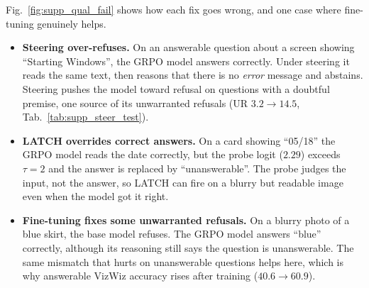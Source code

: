 Fig.~\ref{fig:supp_qual_fail} shows how each fix goes wrong, and one case where fine-tuning
genuinely helps.
\begin{itemize}\itemsep0pt
  \item \textbf{Steering over-refuses.} On an answerable question about a screen showing
        ``Starting Windows'', the GRPO model answers correctly. Under steering it reads the
        same text, then reasons that there is no \emph{error} message and abstains. Steering
        pushes the model toward refusal on questions with a doubtful premise, one source of
        its unwarranted refusals (UR $3.2\rightarrow14.5$, Tab.~\ref{tab:supp_steer_test}).
  \item \textbf{LATCH overrides correct answers.} On a card showing ``05/18'' the GRPO
        model reads the date correctly, but the probe logit ($2.29$) exceeds $\tau{=}2$ and
        the answer is replaced by ``unanswerable''. The probe judges the input, not the
        answer, so LATCH can fire on a blurry but readable image even when the model got it
        right.
  \item \textbf{Fine-tuning fixes some unwarranted refusals.} On a blurry photo of a blue
        skirt, the base model refuses. The GRPO model answers ``blue'' correctly, although
        its reasoning still says the question is unanswerable. The same mismatch that hurts
        on unanswerable questions helps here, which is why answerable VizWiz accuracy rises
        after training ($40.6\rightarrow60.9$).
\end{itemize}

